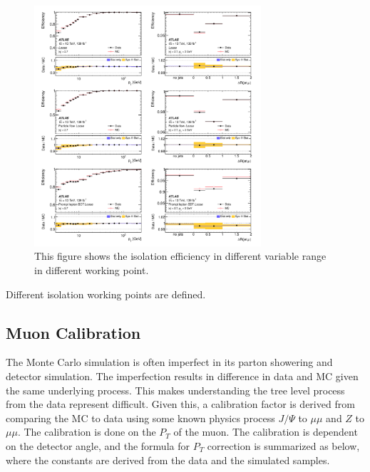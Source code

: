 
\begin{figure}[!htb]
    \begin{center}
        \includegraphics[width=0.75\textwidth]{figures/common_ana/IsolationEff1}
        \caption{
            This figure shows the isolation efficiency in different variable range in different working point\cite{Aad:2746302}.
        }
        \label{fig:isolationWP}
    \end{center}
\end{figure}

Different isolation working points are defined. 


\subsection{Muon Calibration}
The Monte Carlo simulation is often imperfect in its parton showering and detector simulation. The imperfection results in difference in data and MC given the same underlying process. This makes understanding the tree level process from the data represent difficult. Given this, a calibration factor is derived from comparing the MC to data using some known physics process $J/\Psi$ to $\mu \mu$ and $Z$ to $\mu \mu$. The calibration is done on the $P_{T}$ of the muon. 
The calibration is dependent on the detector angle, and the formula for $P_{T}$ correction is summarized as below, where the constants are derived from the data and the simulated samples.

